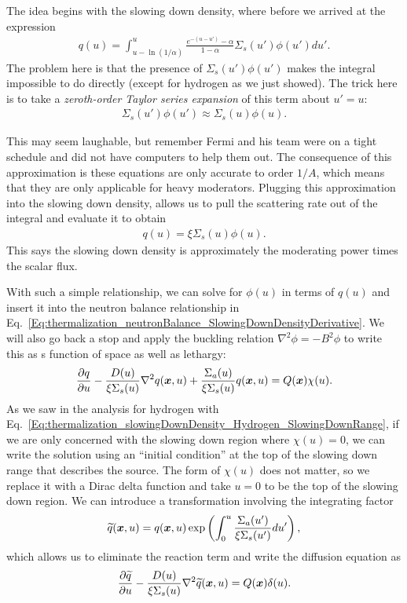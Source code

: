 The idea begins with the slowing down density, where before we arrived at the expression
\begin{align}
  q(u) = \int_{u-\ln(1/\alpha)}^{u} \frac{e^{-(u-u')} - \alpha}{1 - \alpha} \Sigma_s(u') \phi(u') du' .
\end{align}
The problem here is that the presence of $\Sigma_s(u') \phi(u')$ makes the integral impossible to do directly (except for hydrogen as we just showed). The trick here is to take a \emph{zeroth-order Taylor series expansion} of this term about $u' = u$:
\begin{align}
  \Sigma_s(u') \phi(u') \approx \Sigma_s(u) \phi(u) .
\end{align}

This may seem laughable, but remember Fermi and his team were on a tight schedule and did not have computers to help them out. The consequence of this approximation is these equations are only accurate to order $1/A$, which means that they are only applicable for heavy moderators. Plugging this approximation into the slowing down density, allows us to pull the scattering rate out of the integral and evaluate it to obtain
\begin{align}
  q(u) = \xi \Sigma_s(u) \phi(u) . \label{Eq:thermalization_slowingDownDensity_AgeTheory}
\end{align}
This says the slowing down density is approximately the moderating power times the scalar flux.

With such a simple relationship, we can solve for $\phi(u)$ in terms of $q(u)$ and insert it into the neutron balance relationship in Eq.~\eqref{Eq:thermalization_neutronBalance_SlowingDownDensityDerivative}. We will also go back a stop and apply the buckling relation $\nabla^2 \phi = -B^2 \phi$ to write this as s function of space as well as lethargy:
\begin{align}
  \frac{ \partial {q} }{ \partial {u} } - \frac{D(u)}{\xi \Sigma_s(u)} \nabla^2 q(\bm{x},u) + \frac{\Sigma_a(u)}{\xi \Sigma_s(u)} q(\bm{x},u) = Q(\bm{x}) \chi(u) . \label{Eq:thermalization_continuousSlowingDown_SlowingDownDensityDiffusionEqn}
\end{align}
As we saw in the analysis for hydrogen with Eq.~\eqref{Eq:thermalization_slowingDownDensity_Hydrogen_SlowingDownRange}, if we are only concerned with the slowing down region where $\chi(u) = 0$, we can write the solution using an ``initial condition'' at the top of the slowing down range that describes the source. The form of $\chi(u)$ does not matter, so we replace it with a Dirac delta function and take $u = 0$ to be the top of the slowing down region. We can introduce a transformation involving the integrating factor
\begin{align}
  \widetilde{q}(\bm{x},u) = q(\bm{x},u) \exp\left( \int_0^u \frac{\Sigma_a(u')}{\xi \Sigma_s(u')} du'  \right),
\end{align}
which allows us to eliminate the reaction term and write the diffusion equation as
\begin{align}
  \frac{ \partial {\widetilde{q}} }{ \partial {u} } - \frac{D(u)}{\xi \Sigma_s(u)} \nabla^2 \widetilde{q}(\bm{x},u) = Q(\bm{x}) \delta(u) .
\end{align}

